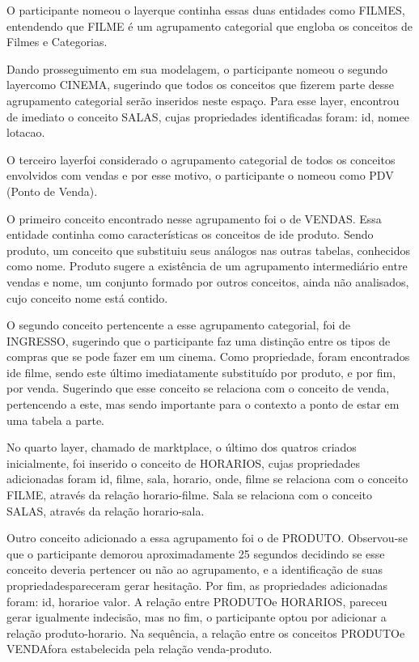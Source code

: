 O participante nomeou o layerque continha essas duas entidades como FILMES, entendendo que FILME é um agrupamento categorial que engloba os conceitos de Filmes e Categorias.

Dando prosseguimento em sua modelagem, o participante nomeou o segundo layercomo CINEMA, sugerindo que todos os conceitos que fizerem parte desse agrupamento categorial serão inseridos neste espaço. Para esse layer, encontrou de imediato o conceito SALAS, cujas propriedades identificadas foram: id, nomee lotacao.

O terceiro layerfoi considerado o agrupamento categorial de todos os conceitos envolvidos com vendas e por esse motivo, o participante o nomeou como PDV (Ponto de Venda).

O primeiro conceito encontrado nesse agrupamento foi o de VENDAS. Essa entidade continha como características os conceitos de ide produto. Sendo produto, um conceito que substituiu seus análogos nas outras tabelas, conhecidos como nome. Produto sugere a existência de um agrupamento intermediário entre vendas e nome, um conjunto formado por outros conceitos, ainda não analisados, cujo conceito nome está contido.

O segundo conceito pertencente a esse agrupamento categorial, foi de INGRESSO, sugerindo que o participante faz uma distinção entre os tipos de compras que se pode fazer em um cinema. Como propriedade, foram encontrados ide filme, sendo este último imediatamente substituído por produto, e por fim, por venda. Sugerindo que esse conceito se relaciona com o conceito de venda, pertencendo a este, mas sendo importante para o contexto a ponto de estar em uma tabela a parte.

No quarto layer, chamado de marktplace, o último dos quatros criados inicialmente, foi inserido o conceito de HORARIOS, cujas propriedades adicionadas foram id, filme, sala, horario, onde, filme se relaciona com o conceito FILME, através da relação horario-filme. Sala se relaciona com o conceito SALAS, através da relação horario-sala.

Outro conceito adicionado a essa agrupamento foi o de PRODUTO. Observou-se que o participante demorou aproximadamente 25 segundos decidindo se esse conceito deveria pertencer ou não ao agrupamento, e a identificação de suas propriedadespareceram gerar hesitação. Por fim, as propriedades adicionadas foram: id, horarioe valor. A relação entre PRODUTOe HORARIOS, pareceu gerar igualmente indecisão, mas no fim, o participante optou por adicionar a relação produto-horario. Na sequência, a relação entre os conceitos PRODUTOe VENDAfora estabelecida pela relação venda-produto.

